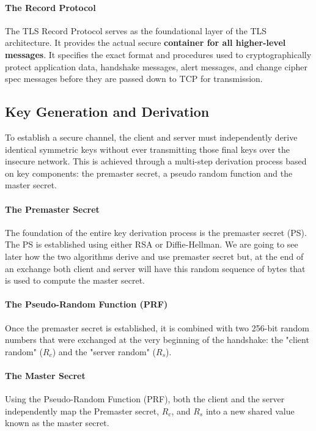 \paragraph{The Record Protocol}
The TLS Record Protocol serves as the foundational layer of the TLS architecture. It provides the actual secure \textbf{container for all higher-level messages}. It specifies the exact format and procedures used to cryptographically protect application data, handshake messages, alert messages, and change cipher spec messages before they are passed down to TCP for transmission.


\subsection{Key Generation and Derivation}

To establish a secure channel, the client and server must independently derive identical symmetric keys without ever transmitting those final keys over the insecure network. This is achieved through a multi-step derivation process based on key components: the premaster secret, a pseudo random function and the master secret.

\paragraph{The Premaster Secret}
The foundation of the entire key derivation process is the premaster secret (PS). The PS is established using either RSA or Diffie-Hellman.
We are going to see later how the two algorithms derive and use premaster secret but, at the end of an exchange both client and server will have this random sequence of bytes that is used to compute the master secret.

\paragraph{The Pseudo-Random Function (PRF)}
Once the premaster secret is established, it is combined with two 256-bit random numbers that were exchanged at the very beginning of the handshake: the "client random" ($R_c$) and the "server random" ($R_s$).

\paragraph{The Master Secret}
Using the Pseudo-Random Function (PRF), both the client and the server independently map the Premaster secret, $R_c$, and $R_s$ into a new shared value known as the master secret.

